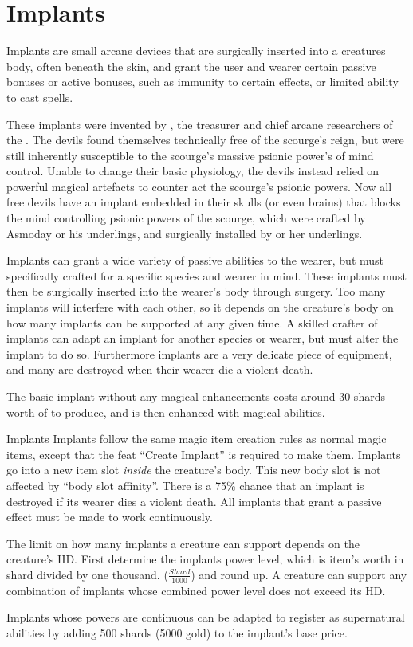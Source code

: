 \section{Implants}
\label{sec:Implants}

Implants are small arcane devices that are surgically inserted into a
creatures body, often beneath the skin, and grant the user and wearer certain
passive bonuses or active bonuses, such as immunity to certain effects, or
limited ability to cast spells.

These implants were invented by , the treasurer and chief
arcane researchers of the . The devils found themselves
technically free of the scourge's reign, but were still inherently susceptible
to the scourge's massive psionic power's of mind control. Unable to change their
basic physiology, the devils instead relied on powerful magical artefacts to
counter act the scourge's psionic powers. Now all free devils have an implant
embedded in their skulls (or even brains) that blocks the mind controlling
psionic powers of the scourge, which were crafted by Asmoday or his underlings,
and surgically installed by  or her underlings.

Implants can grant a wide variety of passive abilities to the wearer, but must
specifically crafted for a specific species and wearer in mind. These implants
must then be surgically inserted into the wearer's body through surgery. Too
many implants will interfere with each other, so it depends on the creature's
body on how many implants can be supported at any given time. A skilled
crafter of implants can adapt an implant for another species or wearer, but must
alter the implant to do so. Furthermore implants are a very delicate piece of
equipment, and many are destroyed when their wearer die a violent death.

The basic implant without any magical enhancements costs around 30 shards
worth of  to produce, and is then enhanced with magical
abilities.

\begin{35e}{Implants}
  Implants follow the same magic item creation rules as normal magic items,
  except that the feat ``Create Implant'' is required to make them. Implants go
  into a new item slot \emph{inside} the creature's body. This new body slot is
  not affected by ``body slot affinity''. There is a 75\% chance that an implant
  is destroyed if its wearer dies a violent death. All implants that grant a
  passive effect must be made to work continuously.

  The limit on how many implants a creature can support depends on the
  creature's HD. First determine the implants power level, which is item's
  worth in shard divided by one thousand. ($ \frac{Shard}{1000} $) and round
  up. A creature can support any combination of implants whose combined power
  level does not exceed its HD.

  Implants whose powers are continuous can be adapted to register as
  supernatural abilities by adding 500 shards (5000 gold) to the implant's
  base price.
\end{35e}


